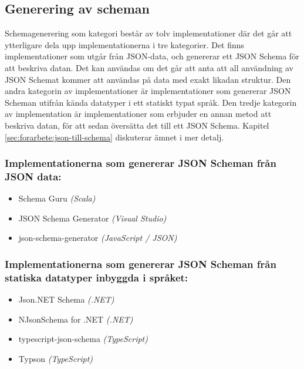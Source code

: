 \subsection{Generering av scheman}
\label{sec:teori:schema-användningsområden:generering}
Schemagenerering som kategori består av tolv implementationer där det går att ytterligare dela upp implementationerna i tre kategorier. Det finns implementationer som utgår från JSON-data, och genererar ett JSON Schema för att beskriva datan. Det kan användas om det går att anta att all användning av JSON Schemat kommer att användas på data med exakt likadan struktur. Den andra kategorin av implementationer är implementationer som genererar JSON Scheman utifrån kända datatyper i ett statiskt typat språk. Den tredje kategorin av implementation är implementationer som erbjuder en annan metod att beskriva datan, för att sedan översätta det till ett JSON Schema. Kapitel \ref{sec:forarbete:json-till-schema} diskuterar ämnet i mer detalj.

\subsubsection{Implementationerna som genererar JSON Scheman från JSON data:}
\begin{itemize}
	\item Schema Guru \textit{(Scala)} \cite{Snowplow}
	\item JSON Schema Generator \textit{(Visual Studio)} \cite{MadsKristensen}
	\item json-schema-generator \textit{(JavaScript / JSON)} \cite{Gordon}
\end{itemize}

\subsubsection{Implementationerna som genererar JSON Scheman från statiska datatyper inbyggda i språket:}
\begin{itemize}
	\item Json.NET Schema \textit{(.NET)} \cite{Newtonsoft}
	\item NJsonSchema for .NET \textit{(.NET)} \cite{Suter}
	\item typescript-json-schema \textit{(TypeScript)} \cite{El-Dardiry}
	\item Typson \textit{(TypeScript)} \cite{Bovet}
\end{itemize}

